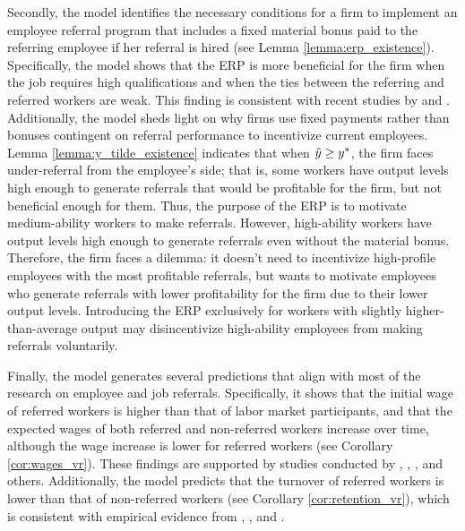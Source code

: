 \documentclass[12pt]{article}
\begin{document}
Secondly, the model identifies the necessary conditions for a firm to implement an employee referral program that includes a fixed material bonus paid to the referring employee if her referral is hired (see Lemma \ref{lemma:erp_existence}). Specifically, the model shows that the ERP is more beneficial for the firm when the job requires high qualifications and when the ties between the referring and referred workers are weak. This finding is consistent with recent studies by \cite{friebel2023employee} and \cite{lester2021heterogeneous}. Additionally, the model sheds light on why firms use fixed payments rather than bonuses contingent on referral performance to incentivize current employees. Lemma \ref{lemma:y_tilde_existence} indicates that when $\Tilde{y} \geq y^*$, the firm faces under-referral from the employee's side; that is, some workers have output levels high enough to generate referrals that would be profitable for the firm, but not beneficial enough for them. Thus, the purpose of the ERP is to motivate medium-ability workers to make referrals. However, high-ability workers have output levels high enough to generate referrals even without the material bonus. Therefore, the firm faces a dilemma: it doesn't need to incentivize high-profile employees with the most profitable referrals, but wants to motivate employees who generate referrals with lower profitability for the firm due to their lower output levels. Introducing the ERP exclusively for workers with slightly higher-than-average output  may disincentivize high-ability employees from making referrals voluntarily.

Finally, the model generates several predictions that align with most of the research on employee and job referrals. Specifically, it shows that the initial wage of referred workers is higher than that of labor market participants, and that the expected wages of both referred and non-referred workers increase over time, although the wage increase is lower for referred workers (see Corollary \ref{cor:wages_vr}). These findings are supported by studies conducted by \cite{corcoran1980most}, \cite{montgomery1991social}, \cite{dustmann2016referral}, and others. Additionally, the model predicts that the turnover of referred workers is lower than that of non-referred workers (see Corollary \ref{cor:retention_vr}), which is consistent with empirical evidence from \cite{pallais2016referential}, \cite{lalanne2016old}, and \cite{lalanne2021social}.
\end{document}
